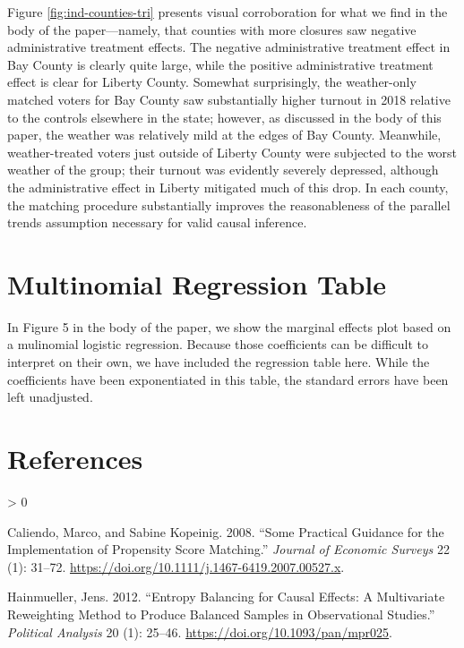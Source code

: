 \documentclass[
  12pt,
]{article}
\newlength{\cslhangindent}
\newenvironment{CSLReferences}[2] %
 {%
  \setlength{\parindent}{0pt}
  \ifodd #1 \everypar{\setlength{\hangindent}{\cslhangindent}}\ignorespaces\fi
  \ifnum #2 > 0
  \setlength{\parskip}{#2\baselineskip}
  \fi
 }%
 {}
\begin{document}
Figure \ref{fig:ind-counties-tri} presents visual corroboration for what we find in the body of the paper---namely, that counties with more closures saw negative administrative treatment effects. The negative administrative treatment effect in Bay County is clearly quite large, while the positive administrative treatment effect is clear for Liberty County. Somewhat surprisingly, the weather-only matched voters for Bay County saw substantially higher turnout in 2018 relative to the controls elsewhere in the state; however, as discussed in the body of this paper, the weather was relatively mild at the edges of Bay County. Meanwhile, weather-treated voters just outside of Liberty County were subjected to the worst weather of the group; their turnout was evidently severely depressed, although the administrative effect in Liberty mitigated much of this drop. In each county, the matching procedure substantially improves the reasonableness of the parallel trends assumption necessary for valid causal inference.

\hypertarget{multinomial-regression-table}{%
\section*{Multinomial Regression Table}\label{multinomial-regression-table}}

In Figure 5 in the body of the paper, we show the marginal effects plot based on a mulinomial logistic regression. Because those coefficients can be difficult to interpret on their own, we have included the regression table here. While the coefficients have been exponentiated in this table, the standard errors have been left unadjusted.

\begin{singlespace}

\end{singlespace}

\hypertarget{references}{%
\section*{References}\label{references}}

\hypertarget{refs}{}
\begin{CSLReferences}{1}{0}
\leavevmode\hypertarget{ref-Caliendo2008}{}%
Caliendo, Marco, and Sabine Kopeinig. 2008. {``Some {Practical Guidance} for the {Implementation} of {Propensity Score Matching}.''} \emph{Journal of Economic Surveys} 22 (1): 31--72. \url{https://doi.org/10.1111/j.1467-6419.2007.00527.x}.

\leavevmode\hypertarget{ref-Hainmueller2012}{}%
Hainmueller, Jens. 2012. {``Entropy {Balancing} for {Causal Effects}: {A Multivariate Reweighting Method} to {Produce Balanced Samples} in {Observational Studies}.''} \emph{Political Analysis} 20 (1): 25--46. \url{https://doi.org/10.1093/pan/mpr025}.

\end{CSLReferences}
\end{document}
